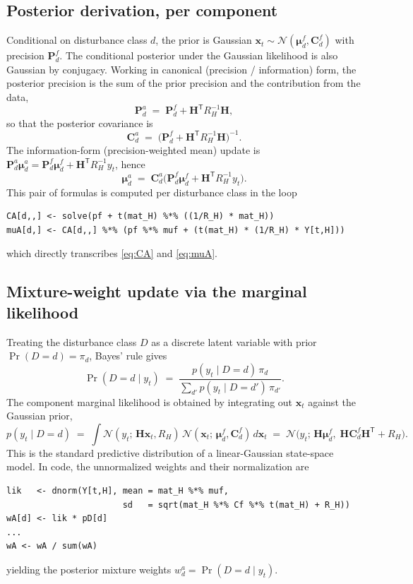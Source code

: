 \documentclass[11pt]{article}
\newcommand{\T}{^{\mathsf T}}
\newcommand{\inv}{^{-1}}
\begin{document}
\subsection{Posterior derivation, per component}

Conditional on disturbance class $d$, the prior is Gaussian
$\bm x_t \sim \mathcal N(\bm\mu^{f}_d, \bm C^{f}_d)$ with precision
$\bm P^{f}_d$.  The conditional posterior under the Gaussian likelihood
is also Gaussian by conjugacy.  Working in canonical (precision /
information) form, the posterior precision is the sum of the prior
precision and the contribution from the data,
\begin{equation}
  \bm P^{a}_d
  \;=\; \bm P^{f}_d + \bm H\T R_H\inv \bm H,
  \label{eq:precision-update}
\end{equation}
so that the posterior covariance is
\begin{equation}
  \boxed{\;
  \bm C^{a}_d \;=\;
   \bigl(\bm P^{f}_d + \bm H\T R_H\inv \bm H\bigr)\inv.
  \;}
  \label{eq:CA}
\end{equation}
The information-form (precision-weighted mean) update is
$\bm P^{a}_d \bm\mu^{a}_d
   = \bm P^{f}_d \bm\mu^{f}_d + \bm H\T R_H\inv y_t$, hence
\begin{equation}
  \boxed{\;
  \bm\mu^{a}_d \;=\;
   \bm C^{a}_d
   \bigl(\bm P^{f}_d \bm\mu^{f}_d
         + \bm H\T R_H\inv y_t\bigr).
  \;}
  \label{eq:muA}
\end{equation}
This pair of formulas is computed per disturbance class in the loop
\begin{lstlisting}
CA[d,,] <- solve(pf + t(mat_H) %*% ((1/R_H) * mat_H))
muA[d,] <- CA[d,,] %*% (pf %*% muf + (t(mat_H) * (1/R_H) * Y[t,H]))
\end{lstlisting}
which directly transcribes \eqref{eq:CA} and \eqref{eq:muA}.

\subsection{Mixture-weight update via the marginal likelihood}

Treating the disturbance class $D$ as a discrete latent variable with
prior $\Pr(D=d) = \pi_d$, Bayes' rule gives
\[
  \Pr(D = d \mid y_t)
  \;=\;
  \frac{p(y_t \mid D=d)\,\pi_d}{\sum_{d'} p(y_t \mid D=d')\,\pi_{d'}}.
\]
The component marginal likelihood is obtained by integrating out
$\bm x_t$ against the Gaussian prior,
\[
  p(y_t \mid D=d)
  \;=\;
  \int \mathcal N(y_t;\, \bm H \bm x_t, R_H)\,
       \mathcal N(\bm x_t;\, \bm\mu^{f}_d, \bm C^{f}_d)\, d\bm x_t
  \;=\;
  \mathcal N\!\bigl(y_t;\,
                    \bm H \bm\mu^{f}_d,\;
                    \bm H \bm C^{f}_d \bm H\T + R_H\bigr).
\]
This is the standard predictive distribution of a linear-Gaussian
state-space model.  In code, the unnormalized weights and their
normalization are
\begin{lstlisting}
lik   <- dnorm(Y[t,H], mean = mat_H %*% muf,
                       sd   = sqrt(mat_H %*% Cf %*% t(mat_H) + R_H))
wA[d] <- lik * pD[d]
...
wA <- wA / sum(wA)
\end{lstlisting}
yielding the posterior mixture weights $w^{a}_d = \Pr(D=d \mid y_t)$.
\end{document}

